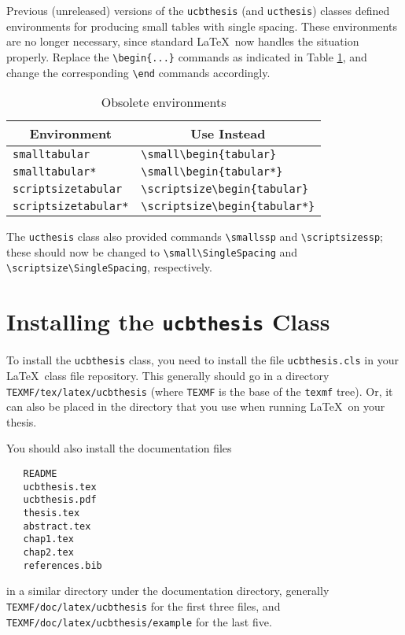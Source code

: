 \documentclass[11pt]{article}
\newcommand*{\pkg}[1]{\texttt{#1}}
\begin{document}
Previous (unreleased) versions of the \pkg{ucbthesis} (and \pkg{ucthesis})
classes defined environments for producing small tables with single spacing.
These environments are no longer necessary, since standard \LaTeX\ now
handles the situation properly.  Replace the \verb!\begin{...}!
commands as indicated in Table \ref{obsolenv}, and change the
corresponding \verb!\end! commands accordingly.

\begin{table}[htbp]
\centering
\begin{tabular}{l l}
  \toprule
  \multicolumn{1}{c}{Environment} & \multicolumn{1}{c}{Use Instead}\\
  \midrule
  \lstinline!smalltabular! & \lstinline!\small\begin{tabular}! \\
  \lstinline!smalltabular*! & \lstinline!\small\begin{tabular*}! \\
  \lstinline!scriptsizetabular! & \lstinline!\scriptsize\begin{tabular}! \\
  \lstinline!scriptsizetabular*! & \lstinline!\scriptsize\begin{tabular*}! \\
  \bottomrule
\end{tabular}
\caption{Obsolete environments}\label{obsolenv}
\end{table}

The \pkg{ucthesis} class also provided commands \verb!\smallssp! and\break
\verb!\scriptsizessp!; these should now be changed to
\verb!\small\SingleSpacing! and \verb!\scriptsize\SingleSpacing!,
respectively.

\section{Installing the \pkg{ucbthesis} Class}

To install the \pkg{ucbthesis} class, you need to install the file
\texttt{ucbthesis.cls} in your \LaTeX\ class file repository.  This
generally should go in a directory \lstinline!TEXMF/tex/latex/ucbthesis!
(where \lstinline!TEXMF!  is the base of the \texttt{texmf} tree).
Or, it can also be placed in the directory that you use when running
\LaTeX\ on your thesis.

You should also install the documentation files
\begin{verbatim}
   README
   ucbthesis.tex
   ucbthesis.pdf
   thesis.tex
   abstract.tex
   chap1.tex
   chap2.tex
   references.bib
\end{verbatim}
in a similar directory under the documentation directory, generally
\lstinline!TEXMF/doc/latex/ucbthesis! for the first three files, and
\lstinline!TEXMF/doc/latex/ucbthesis/example! for the last five.
\end{document}
